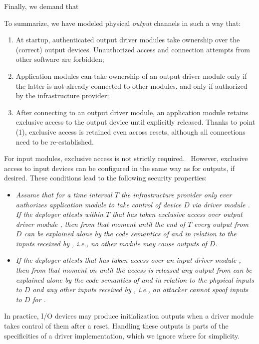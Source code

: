 Finally, we demand that 

To summarize, we have modeled physical \emph{output} channels in such a way that:
%
\begin{enumerate}
    \item  At startup, authenticated output driver modules take
      ownership over the (correct) output devices. Unauthorized access and
      connection attempts from other software are forbidden;
    \item Application modules can take ownership of an output driver module only
      if the latter is not already connected to other modules, and only if
      authorized by the infrastructure provider;
    \item After connecting to an output driver module, an application module
      retains exclusive access to the output device until explicitly released.
       Thanks to point (1), exclusive access is retained even across
      resets, although all connections need to be re-established.
  \end{enumerate}

 For input modules, exclusive access is not strictly
required.~ However, exclusive access to input devices can be
configured in the same way as for outputs, if desired. These conditions lead to
the following security properties:
%
\begin{itemize}
\item \emph{Assume that for a time interval $T$ the infrastructure provider only
  ever authorizes application module  to take control of
  device $D$ via driver module . If the deployer attests within $T$
  that  has taken exclusive access over output driver module
  , then from that moment until the end of $T$ every output from $D$
  can be explained alone by the code semantics of  and  in
  relation to the inputs received by , i.e., no other module may cause
  outputs of $D$.}
\item \emph{If the deployer attests that  has taken access over an
  input driver module , then from that moment on until the access is
  released any output from  can be explained alone by the code
  semantics of  and  in relation to the physical inputs to
  $D$ and any other inputs received by , i.e., an attacker cannot
  spoof inputs to $D$ for .}
\end{itemize}
%
In practice, I/O devices may produce initialization outputs when a
driver module takes control of them after a reset. Handling these outputs
is parts of the specificities of a driver implementation, which we
ignore where for simplicity.

